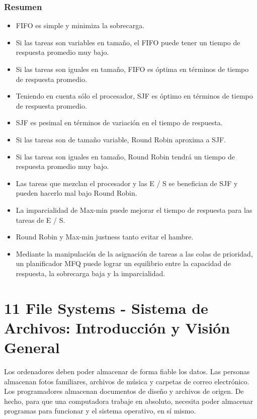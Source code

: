 \documentclass[10pt]{book}
\begin{document}
\subsection{Resumen}
\begin{itemize}
\item FIFO es simple y minimiza la sobrecarga.
\item Si las tareas son variables en tamaño, el FIFO puede tener un tiempo de respuesta promedio muy bajo.
\item Si las tareas son iguales en tamaño, FIFO es óptima en términos de tiempo de respuesta promedio.
\item Teniendo en cuenta sólo el procesador, SJF es óptimo en términos de tiempo de respuesta promedio.
\item SJF es pesimal en términos de variación en el tiempo de respuesta.
\item Si las tareas son de tamaño variable, Round Robin aproxima a SJF.
\item Si las tareas son iguales en tamaño, Round Robin tendrá un tiempo de respuesta promedio muy bajo.
\item Las tareas que mezclan el procesador y las E / S se benefician de SJF y pueden hacerlo mal bajo Round Robin.
\item La imparcialidad de Max-min puede mejorar el tiempo de respuesta para las tareas de E / S.
\item Round Robin y Max-min justness tanto evitar el hambre.
\item Mediante la manipulación de la asignación de tareas a las colas de prioridad, un planificador MFQ puede lograr un equilibrio entre la capacidad de respuesta, la sobrecarga baja y la imparcialidad.
\end{itemize}

\chapter{11 File Systems - Sistema de Archivos: Introducción y Visión General}
Los ordenadores deben poder almacenar de forma fiable los datos. Las personas almacenan fotos familiares, archivos de música y carpetas de correo electrónico. Los programadores almacenan documentos de diseño y archivos de origen. De hecho, para que una computadora trabaje en absoluto, necesita poder almacenar programas para funcionar y el sistema operativo, en sí mismo.
\end{document}
